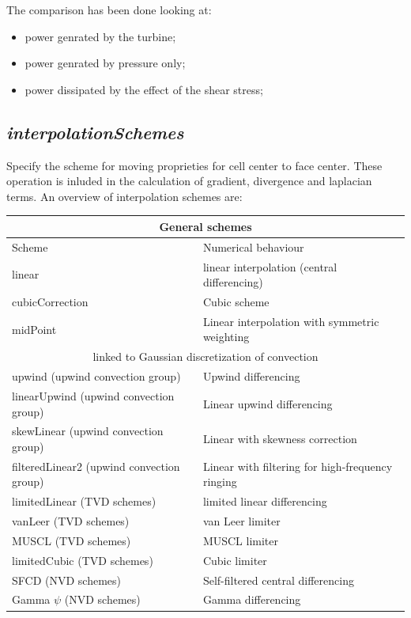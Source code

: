 \documentclass[a4paper,12pt]{article}
\begin{document}
The comparison has been done looking at:
\begin{itemize} 
 \item power genrated by the turbine;
 \item power genrated by pressure only;
 \item power dissipated by the effect of the shear stress;
 \end{itemize} 
\subsection{\textit{interpolationSchemes}}
Specify the scheme for moving proprieties for cell center to face center. These operation is inluded in the calculation of gradient, divergence and laplacian terms. An overview of interpolation schemes are:

\begin{tabular}{ |p{6cm}|p{10cm}|  }
 \multicolumn{2}{|c|}{General schemes} \\
 \hline
 \hline
 Scheme & Numerical behaviour \\ [0.5ex] 
 \hline\hline
 linear & linear interpolation (central differencing) \\ 
 \hline
 cubicCorrection & Cubic scheme  \\
 \hline
 midPoint & Linear interpolation with symmetric weighting  \\
 \hline
  \multicolumn{2}{|c|}{linked to Gaussian discretization of convection} \\
 \hline
 \hline
 upwind (upwind convection group) & Upwind differencing   \\
 \hline
 linearUpwind (upwind convection group) & Linear upwind differencing   \\
 \hline
 skewLinear (upwind convection group) & Linear with skewness correction   \\
 \hline
 filteredLinear2 (upwind convection group) & Linear with filtering for high-frequency ringing   \\
 \hline
 limitedLinear (TVD schemes) & limited linear differencing    \\
 \hline
 vanLeer (TVD schemes)  & van Leer limiter  \\
 \hline
 MUSCL (TVD schemes)  & MUSCL limiter   \\
 \hline
 limitedCubic (TVD schemes)  & Cubic limiter   \\
 \hline
 SFCD (NVD schemes)  & Self-filtered central differencing    \\
 \hline
 Gamma $\psi$  (NVD schemes) & Gamma differencing \\
 \hline
\end{tabular}
\end{document}
